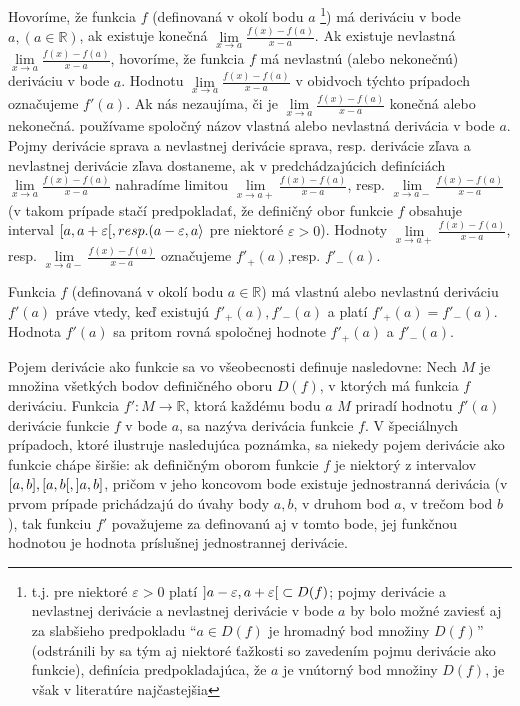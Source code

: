 Hovoríme, že funkcia $f$ (definovaná v okolí bodu $a$ \footnote{t.j. pre
niektoré $\varepsilon>0$ platí $\interval[open]{a-\varepsilon}{a+\varepsilon}
\subset D(f)$; pojmy derivácie a nevlastnej derivácie a nevlastnej derivácie v
bode $a$ by bolo možné zaviesť aj za slabšieho predpokladu \enquote{$a \in D(f)$
je hromadný bod množiny $D(f)$} (odstránili by sa tým aj niektoré ťažkosti so
zavedením pojmu derivácie ako funkcie), definícia predpokladajúca, že $a$ je
vnútorný bod množiny $D(f)$, je však v literatúre najčastejšia}) má deriváciu v
bode $a,(a \in \mathbb{R})$, ak existuje konečná $\lim\limits_{x \rightarrow
a}\frac{f(x)-f(a)}{x-a}$. Ak existuje nevlastná $\lim\limits_{x \rightarrow
a}\frac{f(x)-f(a)}{x-a}$, hovoríme, že funkcia $f$ má nevlastnú (alebo
nekonečnú) deriváciu v bode $a$. Hodnotu $\lim\limits_{x \rightarrow
a}\frac{f(x)-f(a)}{x-a}$ v obidvoch týchto prípadoch označujeme $f'(a)$. Ak nás
nezaujíma, či je $\lim\limits_{x \rightarrow a}\frac{f(x)-f(a)}{x-a}$ konečná
alebo nekonečná. používame spoločný názov vlastná alebo nevlastná derivácia v
bode $a$. Pojmy derivácie sprava a nevlastnej derivácie sprava, resp. derivácie
zľava a nevlastnej derivácie zľava dostaneme, ak v predchádzajúcich definíciách
$\lim\limits_{x \rightarrow a}\frac{f(x)-f(a)}{x-a}$ nahradíme limitou
$\lim\limits_{x \rightarrow a+}\frac{f(x)-f(a)}{x-a}$, resp. $\lim\limits_{x
\rightarrow a-}\frac{f(x)-f(a)}{x-a}$ (v takom prípade stačí predpokladať, že
definičný obor funkcie $f$ obsahuje interval $\interval[open
right]{a}{a+\varepsilon}, resp. (a-\varepsilon,a\rangle$ pre niektoré
$\varepsilon>0$). Hodnoty $\lim\limits_{x \rightarrow a+}\frac{f(x)-f(a)}{x-a}$,
resp. $\lim\limits_{x \rightarrow a-}\frac{f(x)-f(a)}{x-a}$ označujeme
$f'_+(a)$,resp. $f'_-(a)$.

\begin{veta}
Funkcia $f$ (definovaná v okolí bodu $a \in \mathbb{R}$) má vlastnú alebo
nevlastnú deriváciu $f'(a)$ práve vtedy, keď existujú $f'_+(a),f'_-(a)$ a platí
$f'_+(a)=f'_-(a)$. Hodnota $f'(a)$ sa pritom rovná spoločnej hodnote $f'_+(a)$ a
$f'_-(a)$.
\end{veta}

Pojem derivácie ako funkcie sa vo všeobecnosti definuje nasledovne: Nech $M$ je
množina všetkých bodov definičného oboru $D(f)$, v ktorých má funkcia $f$
deriváciu. Funkcia $f':M \rightarrow \mathbb{R}$, ktorá každému bodu $a$  $M$
priradí hodnotu $f'(a)$ derivácie funkcie $f$ v bode $a$, sa nazýva derivácia
funkcie $f$. V špeciálnych prípadoch, ktoré ilustruje nasledujúca poznámka, sa
niekedy pojem derivácie ako funkcie chápe širšie: ak definičným oborom funkcie
$f$ je niektorý z intervalov $\interval{a}{b}, \interval[open right]{a}{b},
\interval[open left]{a}{b}$, pričom v jeho koncovom bode existuje jednostranná
derivácia (v prvom prípade prichádzajú do úvahy body $a,b$, v druhom bod $a$, v
trečom bod $b$), tak funkciu $f'$ považujeme za definovanú aj v tomto bode, jej
funkčnou hodnotou je hodnota príslušnej jednostrannej derivácie.

